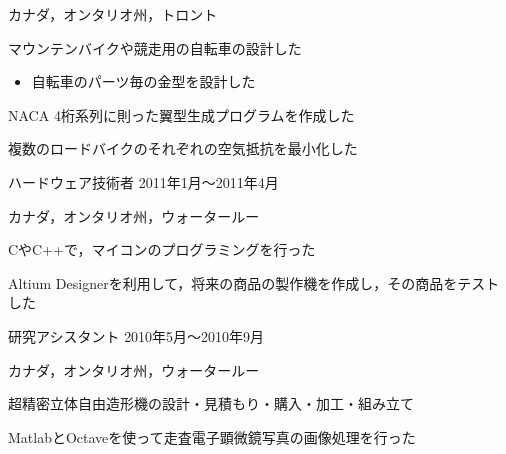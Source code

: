 \documentclass[10pt, a4paper]{article}
\begin{document}
\begin{outerlist}
\vspace{-\baselineskip}    
\hfill カナダ，オンタリオ州，トロント
  \begin{innerlist}
  \item マウンテンバイクや競走用の自転車の設計した
  \begin{itemize}
  \item 自転車のパーツ毎の金型を設計した
  \end{itemize}
  \item NACA 4桁系列に則った翼型生成プログラムを作成した
  \item 複数のロードバイクのそれぞれの空気抵抗を最小化した
  \end{innerlist}

\item[\href{http://www.intellimec.com/}{\parbox[t]{3cm}{\raggedleft Intelligent Mechatronics Systems株式会社}}]{ハードウェア技術者} \hfill {2011年1月〜2011年4月}

\vspace{-2\baselineskip}
\hfill カナダ，オンタリオ州，ウォータールー
  \begin{innerlist}
  \item CやC++で，マイコンのプログラミングを行った
  \item Altium Designerを利用して，将来の商品の製作機を作成し，その商品をテストした
  \end{innerlist}

\item[\href{http://rpl.uwaterloo.ca/}{\parbox[t]{3cm}{\raggedleft ウォータールー大学\\マルチスケール\\積層造形研究室}}]{研究アシスタント} \hfill {2010年5月〜2010年9月}

\vspace{-2\baselineskip}
\hfill カナダ，オンタリオ州，ウォータールー
  \begin{innerlist}
  \item 超精密立体自由造形機の設計・見積もり・購入・加工・組み立て
  \item MatlabとOctaveを使って走査電子顕微鏡写真の画像処理を行った
  \end{innerlist}


\end{outerlist}
\end{document}

